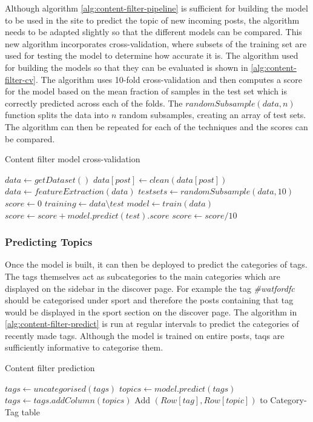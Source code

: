 Although algorithm \ref{alg:content-filter-pipeline} is sufficient for building the model to be used in the site to predict the topic of new incoming posts, the algorithm needs to be adapted slightly so that the different models can be compared. This new algorithm incorporates cross-validation, where subsets of the training set are used for testing the model to determine how accurate it is. The algorithm used for building the models so that they can be evaluated is shown in \ref{alg:content-filter-cv}. The algorithm uses 10-fold cross-validation and then computes a score for the model based on the mean fraction of samples in the test set which is correctly predicted across each of the folds. The $randomSubsample(data,n)$ function splits the data into $n$ random subsamples, creating an array of test sets. The algorithm can then be repeated for each of the techniques and the scores can be compared.

\begin{algorithm}
\caption{Content filter model cross-validation}
\label{alg:content-filter-cv}
\begin{algorithmic}[1]
\State $data\gets getDataset()$
	\State $data[post]\gets clean(data[post])$
\EndFor
\State $data\gets featureExtraction(data)$
\State $testsets\gets randomSubsample(data, 10)$
\State $score\gets 0$
	\State $training\gets data\setminus test$
	\State $model\gets train(data)$
	\State $score\gets score + model.predict(test).score$
\EndFor
\State $score\gets score/10$
\end{algorithmic}
\end{algorithm}

\subsubsection{Predicting Topics}
Once the model is built, it can then be deployed to predict the categories of tags. The tags themselves act as subcategories to the main categories which are displayed on the sidebar in the discover page. For example the tag \textit{\#watfordfc} should be categorised under sport and therefore the posts containing that tag would be displayed in the sport section on the discover page. The algorithm in \ref{alg:content-filter-predict} is run at regular intervals to predict the categories of recently made tags. Although the model is trained on entire posts, taqs are sufficiently informative to categorise them.

\begin{algorithm}
\caption{Content filter prediction}
\label{alg:content-filter-predict}
\begin{algorithmic}[1]
	\State $tags\gets uncategorised(tags)$
	\State $topics\gets model.predict(tags)$
	\State $tags \gets tags.addColumn(topics)$
		\State Add $(Row[tag],Row[topic])$ to Category-Tag table
	\EndFor
\EndFunction
\end{algorithmic}
\end{algorithm}
